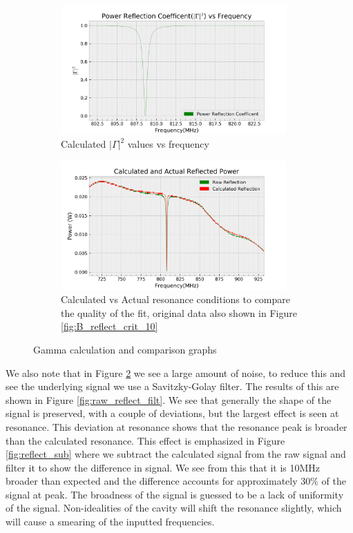 \begin{figure}[h!]
\centering
\begin{subfigure}[t]{.475\textwidth}
  \centering
  \includegraphics[width=0.95\textwidth]{figures/PartB/gamma.png}
  \caption{Calculated $|\Gamma|^2$ values vs frequency}
 \label{fig:gamma}
\end{subfigure}\hfill
\begin{subfigure}[t]{.475\textwidth}
  \centering
  \includegraphics[width=0.95\textwidth]{figures/PartB/reflect_raw.png}
  \caption{Calculated vs Actual resonance conditions to compare the quality of the fit, original data also shown in Figure \ref{fig:B_reflect_crit_10}}
\label{fig:raw_reflect_calc}
\end{subfigure}
\caption{Gamma calculation and comparison graphs}
\label{fig:gamma}
\end{figure}

We also note that in Figure \ref{fig:raw_reflect_calc} we see a large amount of noise, to reduce this and see the underlying signal we use a Savitzky-Golay filter. The results of this are shown in Figure \ref{fig:raw_reflect_filt}. We see that generally the shape of the signal is preserved, with a couple of deviations, but the largest effect is seen at resonance. This deviation at resonance shows that the resonance peak is broader than the calculated resonance. This effect is emphasized in Figure \ref{fig:reflect_sub} where we subtract the calculated signal from the raw signal and filter it to show the difference in signal. We see from this that it is 10MHz broader than expected and the difference accounts for approximately 30\% of the signal at peak. The broadness of the signal is guessed to be a lack of uniformity of the signal. Non-idealities of the cavity will shift the resonance slightly, which will cause a smearing of the inputted frequencies.

